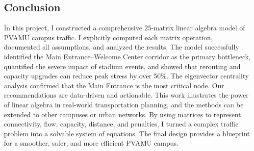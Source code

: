 \documentclass{ximera}
\begin{document}
\subsection*{Conclusion}
In this project, I constructed a comprehensive 25-matrix linear algebra model of PVAMU campus traffic. I explicitly computed each matrix operation, documented all assumptions, and analyzed the results. The model successfully identified the Main Entrance–Welcome Center corridor as the primary bottleneck, quantified the severe impact of stadium events, and showed that rerouting and capacity upgrades can reduce peak stress by over 50\%. The eigenvector centrality analysis confirmed that the Main Entrance is the most critical node. Our recommendations are data-driven and actionable. This work illustrates the power of linear algebra in real-world transportation planning, and the methods can be extended to other campuses or urban networks. By using matrices to represent connectivity, flow, capacity, distance, and penalties, I turned a complex traffic problem into a solvable system of equations. The final design provides a blueprint for a smoother, safer, and more efficient PVAMU campus.
\end{document}
